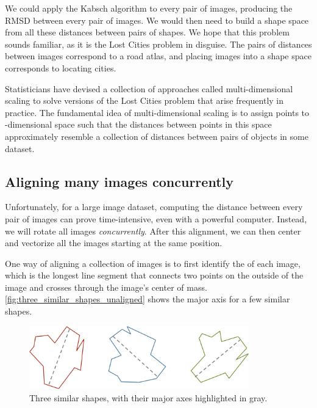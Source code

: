 We could apply the Kabsch algorithm to every pair of images, producing the RMSD between every pair of images. We would then need to build a shape space from all these distances between pairs of shapes. We hope that this problem sounds familiar, as it is the Lost Cities problem in disguise. The pairs of distances between images correspond to a road atlas, and placing images into a shape space corresponds to locating cities.

Statisticians have devised a collection of approaches called multi-dimensional scaling to solve versions of the Lost Cities problem that arise frequently in practice. The fundamental idea of multi-dimensional scaling is to assign points to -dimensional space such that the distances between points in this space approximately resemble a collection of distances between pairs of objects in some dataset.\\

\begin{qbox}\end{qbox}

\FloatBarrier
{}
\subsection{Aligning many images concurrently}

Unfortunately, for a large image dataset, computing the distance between every pair of images can prove time-intensive, even with a powerful computer. Instead, we will rotate all images \textit{concurrently}. After this alignment, we can then center and vectorize all the images starting at the same position.

One way of aligning a collection of images is to first identify the  of each image, which is the longest line segment that connects two points on the outside of the image and crosses through the image's center of mass. \autoref{fig:three_similar_shapes_unaligned} shows the major axis for a few similar shapes.\\

\begin{figure}[h]
\centering
\mySfFamily
\includegraphics[width = 0.85\textwidth]{../images/three_similar_shapes_unaligned.png}
\caption{Three similar shapes, with their major axes highlighted in gray.}
\label{fig:three_similar_shapes_unaligned}
\end{figure}

